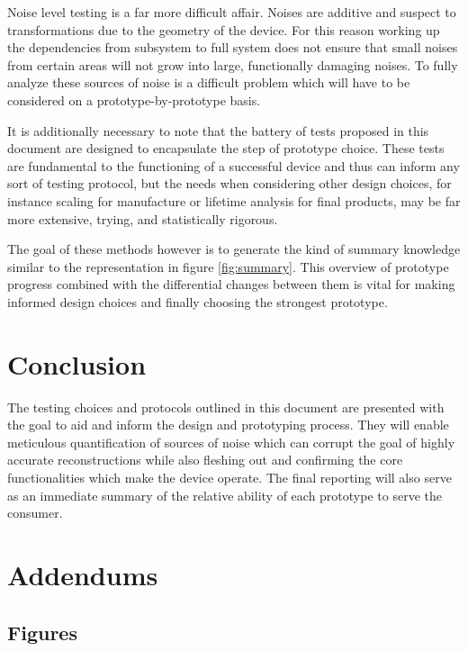 \documentclass{article}
\begin{document}
Noise level testing is a far more difficult affair. Noises are additive and suspect to transformations due to the geometry of the device. For this reason working up the dependencies from subsystem to full system does not ensure that small noises from certain areas will not grow into large, functionally damaging noises. To fully analyze these sources of noise is a difficult problem which will have to be considered on a prototype-by-prototype basis.

It is additionally necessary to note that the battery of tests proposed in this document are designed to encapsulate the step of prototype choice. These tests are fundamental to the functioning of a successful device and thus can inform any sort of testing protocol, but the needs when considering other design choices, for instance scaling for manufacture or lifetime analysis for final products, may be far more extensive, trying, and statistically rigorous.

The goal of these methods however is to generate the kind of summary knowledge similar to the representation in figure \ref{fig:summary}. This overview of prototype progress combined with the differential changes between them is vital for making informed design choices and finally choosing the strongest prototype.

\section{Conclusion}
\label{sec:conclusion}

The testing choices and protocols outlined in this document are presented with the goal to aid and inform the design and prototyping process. They will enable meticulous quantification of sources of noise which can corrupt the goal of highly accurate reconstructions while also fleshing out and confirming the core functionalities which make the device operate. The final reporting will also serve as an immediate summary of the relative ability of each prototype to serve the consumer.

\section{Addendums}
\label{sec:addendums}

\subsection{Figures}
\label{sec:figures}

\newpage
{}


\end{document}
